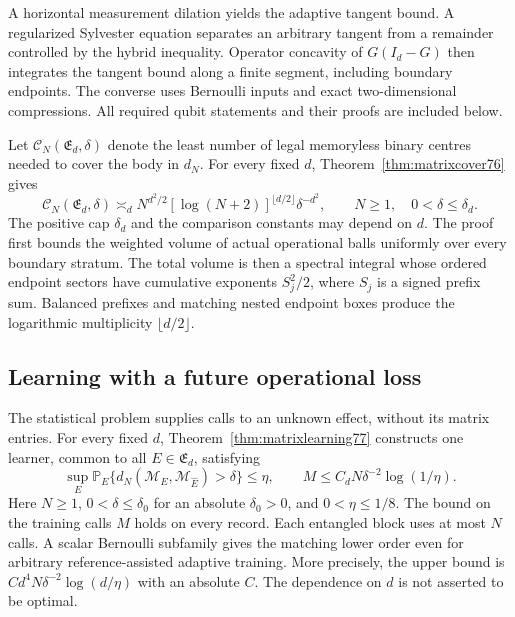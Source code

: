 A horizontal measurement dilation yields the adaptive tangent bound.
A regularized Sylvester equation separates an arbitrary tangent from a
remainder controlled by the hybrid inequality. Operator concavity of
$G(I_d-G)$ then integrates the tangent bound along a finite segment,
including boundary endpoints. The converse uses Bernoulli inputs and
exact two-dimensional compressions. All required qubit statements and
their proofs are included below.

Let $\mathcal C_N(\mathfrak E_d,\delta)$ denote the least number of
legal memoryless binary centres needed to cover the body in $d_N$.
For every fixed $d$, Theorem~\ref{thm:matrixcover76} gives
\begin{equation}\label{eq:introentropy77}
 \mathcal C_N(\mathfrak E_d,\delta)
 \asymp_d N^{d^2/2}[\log(N+2)]^{\lfloor d/2\rfloor}\delta^{-d^2},
 \qquad N\ge1,\quad0<\delta\le\delta_d.
\end{equation}
The positive cap $\delta_d$ and the comparison constants may depend
on $d$. The proof first bounds the weighted volume of actual
operational balls uniformly over every boundary stratum. The total
volume is then a spectral integral whose ordered endpoint sectors have
cumulative exponents $S_j^2/2$, where $S_j$ is a signed prefix sum.
Balanced prefixes and matching nested endpoint boxes produce the
logarithmic multiplicity $\lfloor d/2\rfloor$.

\subsection{Learning with a future operational loss}
The statistical problem supplies calls to an unknown effect, without
its matrix entries. For every fixed $d$, Theorem~\ref{thm:matrixlearning77}
constructs one learner, common to all $E\in\mathfrak E_d$, satisfying
\begin{equation}\label{eq:introlearning77}
 \sup_E\mathbb P_E\{d_N(\mathcal M_E,\mathcal M_{\widehat E})
                         >\delta\}\le\eta,
 \qquad
 M\le C_d N\delta^{-2}\log(1/\eta).
\end{equation}
Here $N\ge1$, $0<\delta\le\delta_0$ for an absolute $\delta_0>0$,
and $0<\eta\le1/8$.
The bound on the training calls $M$ holds on every record. Each
entangled block uses at most $N$ calls. A scalar Bernoulli subfamily
gives the matching lower order even for arbitrary reference-assisted
adaptive training. More precisely, the upper bound is
$Cd^4N\delta^{-2}\log(d/\eta)$ with an absolute $C$.
The dependence on $d$ is not asserted to be optimal.

